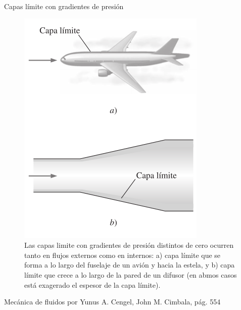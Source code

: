
\begin{frame}{Capas límite con gradientes de presión}
\justifying
\begin{figure}[H]
\centering
\includegraphics[scale=0.25]{Section_Files/S3-imagenes-Jhon/0245.png}
\caption{Las capas limite con gradientes de presión distintos de cero ocurren tanto en flujos externos como en internos: a) capa límite que se forma a lo largo del fuselaje de un avión y hacia la estela, y b) capa límite que crece a lo largo de la pared de un difusor (en abmos casos está exagerado el espesor de la capa límite).}
\end{figure}
{\tiny Mecánica de fluidos por Yunus A. Cengel, John M. Cimbala, pág. 554}
\end{frame}



